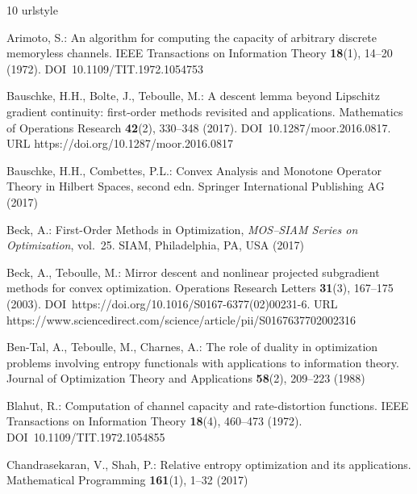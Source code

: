 \documentclass[smallextended,referee,envcountsect,]{svjour3}
\begin{document}
\begin{thebibliography}{10}
\providecommand{\url}[1]{{#1}}
\providecommand{\urlprefix}{URL }
\expandafter\ifx\csname urlstyle\endcsname\relax
  \providecommand{\doi}[1]{DOI~\discretionary{}{}{}#1}\else
  \providecommand{\doi}{DOI~\discretionary{}{}{}\begingroup
  \urlstyle{rm}\Url}\fi

Arimoto, S.: An algorithm for computing the capacity of arbitrary discrete
  memoryless channels.
\newblock IEEE Transactions on Information Theory \textbf{18}(1), 14--20
  (1972).
\newblock \doi{10.1109/TIT.1972.1054753}

Bauschke, H.H., Bolte, J., Teboulle, M.: A descent lemma beyond {L}ipschitz
  gradient continuity: first-order methods revisited and applications.
\newblock Mathematics of Operations Research \textbf{42}(2), 330--348 (2017).
\newblock \doi{10.1287/moor.2016.0817}.
\newblock \urlprefix\url{https://doi.org/10.1287/moor.2016.0817}

Bauschke, H.H., Combettes, P.L.: Convex Analysis and Monotone Operator Theory
  in Hilbert Spaces, second edn.
\newblock Springer International Publishing AG (2017)

Beck, A.: First-Order Methods in Optimization, \emph{MOS--SIAM Series on
  Optimization}, vol.~25.
\newblock SIAM, Philadelphia, PA, USA (2017)

Beck, A., Teboulle, M.: Mirror descent and nonlinear projected subgradient
  methods for convex optimization.
\newblock Operations Research Letters \textbf{31}(3), 167--175 (2003).
\newblock \doi{https://doi.org/10.1016/S0167-6377(02)00231-6}.
\newblock
  \urlprefix\url{https://www.sciencedirect.com/science/article/pii/S0167637702002316}

Ben-Tal, A., Teboulle, M., Charnes, A.: The role of duality in optimization
  problems involving entropy functionals with applications to information
  theory.
\newblock Journal of Optimization Theory and Applications \textbf{58}(2),
  209--223 (1988)

Blahut, R.: Computation of channel capacity and rate-distortion functions.
\newblock IEEE Transactions on Information Theory \textbf{18}(4), 460--473
  (1972).
\newblock \doi{10.1109/TIT.1972.1054855}

Chandrasekaran, V., Shah, P.: {Relative entropy optimization and its
  applications}.
\newblock Mathematical Programming \textbf{161}(1), 1--32 (2017)


\end{thebibliography}
\end{document}

